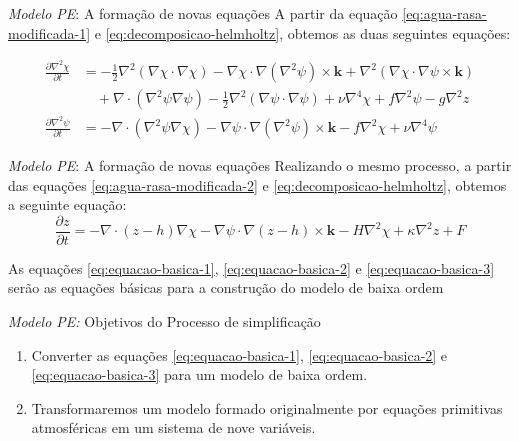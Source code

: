 \begin{frame}{\textit{Modelo PE}: A formação de novas equações}
   A partir da equação \eqref{eq:agua-rasa-modificada-1} e \eqref{eq:decomposicao-helmholtz}, obtemos as duas seguintes equações:
   \begin{small}
       \begin{align}
           \frac{\partial \nabla^2 \chi}{\partial t} &= -\frac{1}{2}\nabla^2(\nabla \chi \cdot \nabla \chi) - \nabla \chi \cdot \nabla(\nabla^2\psi) \times \mathbf{k} + \nabla^2(\nabla \chi \cdot \nabla \psi \times \mathbf{k}) \nonumber \\
           &\quad + \nabla \cdot (\nabla^2\psi\nabla\psi) - \frac{1}{2}\nabla^2(\nabla \psi \cdot \nabla \psi) + \nu\nabla^4\chi + f\nabla^2\psi - g\nabla^2z \label{eq:equacao-basica-1} \\
           \frac{\partial \nabla^2 \psi}{\partial t} &= -\nabla \cdot (\nabla^2\psi\nabla \chi) - \nabla \psi \cdot \nabla(\nabla^2\psi) \times \mathbf{k} - f\nabla^2\chi + \nu\nabla^4\psi\label{eq:equacao-basica-2}
       \end{align}
       \end{small}
\end{frame}


\begin{frame}{\textit{Modelo PE}: A formação de novas equações}
   Realizando o mesmo processo, a partir das equações \eqref{eq:agua-rasa-modificada-2} e \eqref{eq:decomposicao-helmholtz}, obtemos a seguinte equação:
    \begin{equation}
        \frac{\partial z}{\partial t} = -\nabla \cdot (z - h)\nabla \chi - \nabla \psi \cdot \nabla(z - h) \times \mathbf{k} - H\nabla^2\chi + \kappa\nabla^2z + F \label{eq:equacao-basica-3}
    \end{equation}

    As equações \eqref{eq:equacao-basica-1}, \eqref{eq:equacao-basica-2} e \eqref{eq:equacao-basica-3} serão as equações básicas para a construção do modelo de baixa ordem
\end{frame}


\begin{frame}{\textit{Modelo PE:} Objetivos do Processo de simplificação}

\begin{enumerate}
    \item Converter as equações \eqref{eq:equacao-basica-1}, \eqref{eq:equacao-basica-2} e \eqref{eq:equacao-basica-3} para um modelo de baixa ordem. 
    \item Transformaremos um modelo formado originalmente por equações primitivas atmosféricas em um sistema de nove variáveis.
\end{enumerate}
    
\end{frame}

